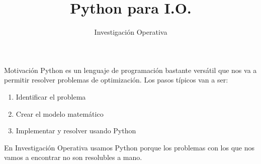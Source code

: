 \documentclass{beamer}
\title{\Huge\textbf{Python para I.O.}}
\author{Investigación Operativa}
\date{}
\begin{document}
\begin{frame}
  \titlepage
\end{frame}

\begin{frame}{Motivación}
Python es un lenguaje de programación bastante versátil que nos va a permitir resolver problemas de optimización. Los pasos típicos van a ser:

\begin{enumerate}
    \item Identificar el problema
    \item Crear el modelo matemático
    \item Implementar y resolver usando Python
\end{enumerate}

\vspace{0.3cm}
En Investigación Operativa usamos Python porque los problemas con los que nos vamos a encontrar no son resolubles a mano.
\end{frame}
\end{document}
